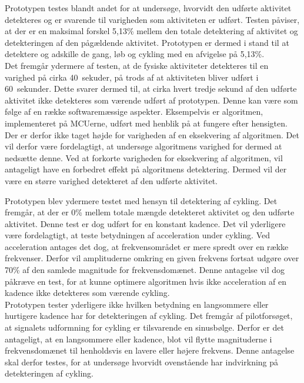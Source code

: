 Prototypen testes blandt andet for at undersøge, hvorvidt den udførte aktivitet detekteres og er svarende til varigheden som aktiviteten er udført. Testen påviser, at der er en maksimal forskel 5,13\% mellem den totale detektering af aktivitet og detekteringen af den pågældende aktivitet. Prototypen er dermed i stand til at detektere og adskille de gang, løb og cykling med en afvigelse på 5,13\%. \\
Det fremgår ydermere af testen, at de fysiske aktiviteter detekteres til en varighed på cirka 40~sekuder, på trods af at aktiviteten bliver udført i 60~sekunder. Dette svarer dermed til, at cirka hvert tredje sekund af den udførte aktivitet ikke detekteres som værende udført af prototypen. Denne kan være som følge af en række softwaremæssige aspekter. Eksempelvis er algoritmen, implementeret på MCUerne, udført med henblik på at fungere efter hensigten. Der er derfor ikke taget højde for varigheden af en eksekvering af algoritmen. Det vil derfor være fordelagtigt, at undersøge algoritmens varighed for dermed at nedsætte denne. Ved at forkorte varigheden for eksekvering af algoritmen, vil antageligt have en forbedret effekt på algoritmens detektering. Dermed vil der være en større varighed detekteret af den udførte aktivitet. 

Prototypen blev ydermere testet med hensyn til detektering af cykling. Det fremgår, at der er 0\% mellem totale mængde detekteret aktivitet og den udførte aktivitet. Denne test er dog udført for en konstant kadence. Det vil yderligere være fordelagtigt, at teste betydningen af acceleration under cykling. Ved acceleration antages det dog, at frekvensområdet er mere spredt over en række frekvenser. Derfor vil amplituderne omkring en given frekvens fortsat udgøre over 70\% af den samlede magnitude for frekvensdomænet. Denne antagelse vil dog påkræve en test, for at kunne optimere algoritmen hvis ikke acceleration af en kadence ikke detekteres som værende cykling. \\
Prototypen tester yderligere ikke hvilken betydning en langsommere eller hurtigere kadence har for detekteringen af cykling. Det fremgår af pilotforsøget, at signalets udformning for cykling er tilsvarende en sinusbølge. Derfor er det antageligt, at en langsommere eller kadence, blot vil flytte magnituderne i frekvensdomænet til henholdsvis en lavere eller højere frekvens. Denne antagelse skal derfor testes, for at undersøge hvorvidt ovenstående har indvirkning på detekteringen af cykling. 

